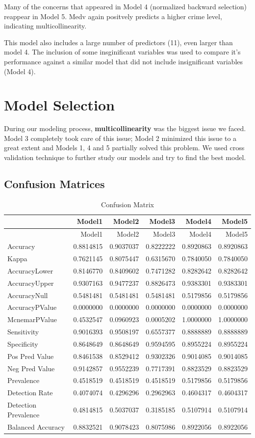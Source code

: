 \documentclass[]{article}
\begin{document}
Many of the concerns that appeared in Model 4 (normalized backward
selection) reappear in Model 5. Medv again positvely predicts a higher
crime level, indicating multicollinearity.

This model also includes a large number of predictors (11), even larger
than model 4. The inclusion of some insginificant variables was used to
compare it's performance against a similar model that did not include
insignificant variables (Model 4).

\section{Model Selection}\label{model-selection}

During our modeling process, \textbf{multicollinearity} was the biggest
issue we faced. Model 3 completely took care of this issue; Model 2
minimized this issue to a great extent and Models 1, 4 and 5 partially
solved this problem. We used cross validation technique to further study
our models and try to find the best model.

\subsection{Confusion Matrices}\label{confusion-matrices}

\begin{longtable}[c]{@{}lrrrrr@{}}
\caption{Confusion Matrix}\tabularnewline
\toprule
& Model1 & Model2 & Model3 & Model4 & Model5\tabularnewline
\midrule
\endfirsthead
\toprule
& Model1 & Model2 & Model3 & Model4 & Model5\tabularnewline
\midrule
\endhead
Accuracy & 0.8814815 & 0.9037037 & 0.8222222 & 0.8920863 &
0.8920863\tabularnewline
Kappa & 0.7621145 & 0.8075447 & 0.6315670 & 0.7840050 &
0.7840050\tabularnewline
AccuracyLower & 0.8146770 & 0.8409602 & 0.7471282 & 0.8282642 &
0.8282642\tabularnewline
AccuracyUpper & 0.9307163 & 0.9477237 & 0.8826473 & 0.9383301 &
0.9383301\tabularnewline
AccuracyNull & 0.5481481 & 0.5481481 & 0.5481481 & 0.5179856 &
0.5179856\tabularnewline
AccuracyPValue & 0.0000000 & 0.0000000 & 0.0000000 & 0.0000000 &
0.0000000\tabularnewline
McnemarPValue & 0.4532547 & 0.0960923 & 0.0005202 & 1.0000000 &
1.0000000\tabularnewline
Sensitivity & 0.9016393 & 0.9508197 & 0.6557377 & 0.8888889 &
0.8888889\tabularnewline
Specificity & 0.8648649 & 0.8648649 & 0.9594595 & 0.8955224 &
0.8955224\tabularnewline
Pos Pred Value & 0.8461538 & 0.8529412 & 0.9302326 & 0.9014085 &
0.9014085\tabularnewline
Neg Pred Value & 0.9142857 & 0.9552239 & 0.7717391 & 0.8823529 &
0.8823529\tabularnewline
Prevalence & 0.4518519 & 0.4518519 & 0.4518519 & 0.5179856 &
0.5179856\tabularnewline
Detection Rate & 0.4074074 & 0.4296296 & 0.2962963 & 0.4604317 &
0.4604317\tabularnewline
Detection Prevalence & 0.4814815 & 0.5037037 & 0.3185185 & 0.5107914 &
0.5107914\tabularnewline
Balanced Accuracy & 0.8832521 & 0.9078423 & 0.8075986 & 0.8922056 &
0.8922056\tabularnewline
\bottomrule
\end{longtable}
\end{document}
